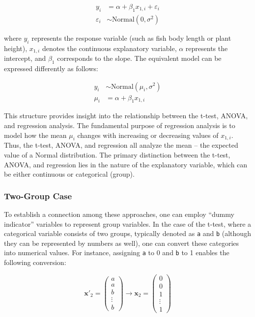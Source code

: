 \documentclass[
]{article}
\begin{document}
\[
\begin{aligned}
y_i &= \alpha + \beta_1 x_{1,i} + \varepsilon_i\\
\varepsilon_i &\sim \text{Normal}(0, \sigma^2)
\end{aligned}
\]

where \(y_i\) represents the response variable (such as fish body length or plant height), \(x_{1,i}\) denotes the continuous explanatory variable, \(\alpha\) represents the intercept, and \(\beta_1\) corresponds to the slope. The equivalent model can be expressed differently as follows:

\[
\begin{aligned}
y_i &\sim \text{Normal}(\mu_i, \sigma^2)\\
\mu_i &= \alpha + \beta_1 x_{1,i}
\end{aligned}
\]

This structure provides insight into the relationship between the t-test, ANOVA, and regression analysis. The fundamental purpose of regression analysis is to model how the mean \(\mu_i\) changes with increasing or decreasing values of \(x_{1,i}\). Thus, the t-test, ANOVA, and regression all analyze the mean -- the expected value of a Normal distribution. The primary distinction between the t-test, ANOVA, and regression lies in the nature of the explanatory variable, which can be either continuous or categorical (group).

\hypertarget{two-group-case}{%
\subsubsection{Two-Group Case}\label{two-group-case}}

To establish a connection among these approaches, one can employ ``dummy indicator'' variables to represent group variables. In the case of the t-test, where a categorical variable consists of two groups, typically denoted as \texttt{a} and \texttt{b} (although they can be represented by numbers as well), one can convert these categories into numerical values. For instance, assigning \texttt{a} to 0 and \texttt{b} to 1 enables the following conversion:

\[
\pmb{x'}_2 =
 \begin{pmatrix}
   a\\
   a\\
   b\\
   \vdots\\
   b\end{pmatrix}
\rightarrow
\pmb{x}_2 =
\begin{pmatrix}
0\\
0\\
1\\
\vdots\\
1
\end{pmatrix}
\]
\end{document}

